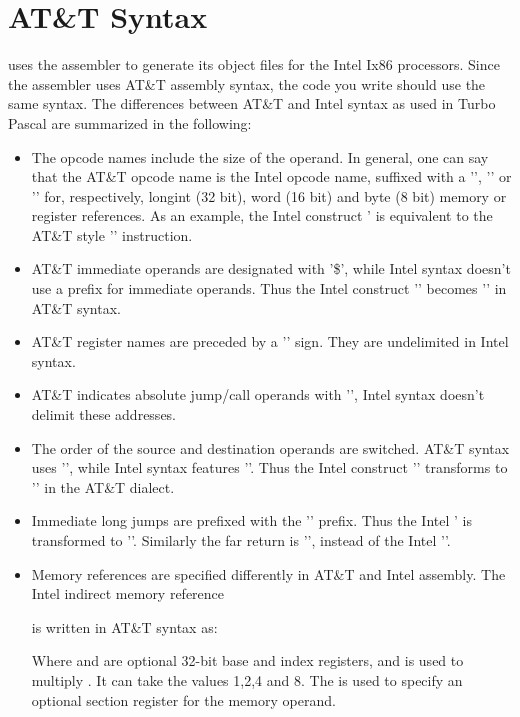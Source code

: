 \section{AT\&T Syntax}
\label{se:AttSyntax}
\fpc uses the \gnu {} assembler to generate its object files for
the Intel Ix86 processors. Since
the \gnu assembler uses AT\&T assembly syntax, the code you write should
use the same syntax. The differences between AT\&T and Intel syntax as used
in Turbo Pascal are summarized in the following:
\begin{itemize}
\item The opcode names include the size of the operand. In general, one can
say that the AT\&T opcode name is the Intel opcode name, suffixed with a
'', '' or '' for, respectively, longint (32 bit),
word (16 bit) and byte (8 bit) memory or register references. As an example,
the Intel construct \mbox{'} is equivalent to the AT\&T style '' instruction.
\item AT\&T immediate operands are designated with '\$', while Intel syntax
doesn't use a prefix for immediate operands. Thus the Intel construct
'' becomes '' in AT\&T syntax.
\item AT\&T register names are preceded by a '\var{\%}' sign.
They are undelimited in Intel syntax.
\item AT\&T indicates absolute jump/call operands with '\var{*}', Intel
syntax doesn't delimit these addresses.
\item The order of the source and destination operands are switched. AT\&T
syntax uses '', while Intel syntax features ''. Thus the Intel construct '' transforms to
'' in the AT\&T dialect.
\item Immediate long jumps are prefixed with the '' prefix. Thus the
Intel ' is transformed to ''. Similarly the far return is '', instead of the
Intel ''.
\item Memory references are specified differently in AT\&T and Intel
assembly. The Intel indirect memory reference
\begin{quote}
\end{quote}
is written in AT\&T syntax as:
\begin{quote}
\end{quote}
Where  and  are optional 32-bit base and index
registers, and  is used to multiply . It can take the
values 1,2,4 and 8. The  is used to specify an optional section
register for the memory operand.
\end{itemize}

